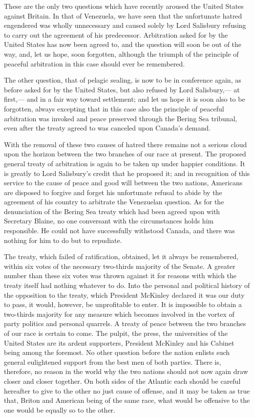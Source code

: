 \documentclass[11pt,openany]{book}
\begin{document}
These are the only two questions which have recently aroused the United States against Britain. In that of Venezuela, we have seen that the unfortunate hatred engendered was wholly unnecessary and caused solely by Lord Salisbury refusing to carry out the agreement of his predecessor. Arbitration asked for by the United States has now been agreed to, and the question will soon be out of the way, and, let us hope, soon forgotten, although the triumph of the principle of peaceful arbitration in this case should ever be remembered.

The other question, that of pelagic sealing, is now to be in conference again, as before asked for by the United States, but also refused by Lord Salisbury,--- at first,--- and in a fair way toward settlement; and let us hope it is soon also to be forgotten, always excepting that in this case also the principle of peaceful arbitration was invoked and peace preserved through the Bering Sea tribunal, even after the treaty agreed to was canceled upon Canada's demand.

With the removal of these two causes of hatred there remains not a serious cloud upon the horizon between the two branches of our race at present. The proposed general treaty of arbitration is again to be taken up under happier conditions. It is greatly to Lord Salisbury's credit that he proposed it; and in recognition of this service to the cause of peace and good will between the two nations, Americans are disposed to forgive and forget his unfortunate refusal to abide by the agreement of his country to arbitrate the Venezuelan question. As for the denunciation of the Bering Sea treaty which had been agreed upon with Secretary Blaine, no one conversant with the circumstances holds him responsible. He could not have successfully withstood Canada, and there was nothing for him to do but to repudiate.

The treaty, which failed of ratification, obtained, let it always be remembered, within six votes of the necessary two-thirds majority of the Senate. A greater number than these six votes was thrown against it for reasons with which the treaty itself had nothing whatever to do. Into the personal and political history of the opposition to the treaty, which President McKinley declared it was our duty to pass, it would, however, be unprofitable to enter. It is impossible to obtain a two-thirds majority for any measure which becomes involved in the vortex of party politics and personal quarrels. A treaty of peace between the two branches of our race is certain to come. The pulpit, the press, the universities of the United States are its ardent supporters, President McKinley and his Cabinet being among the foremost. No other question before the nation enlists such general eulightened support from the best men of both parties. There is, therefore, no reason in the world why the two nations should not now again draw closer and closer together. On both sides of the Atlantic each should be careful hereafter to give to the other no just cause of offense, and it may be taken as true that, Briton and American being of the same race, what would be offensive to the one would be equally so to the other.
\end{document}
